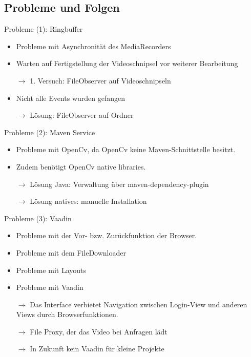 \documentclass[19pt]{beamer}
\begin{document}
\subsection{Probleme und Folgen}
\begin{frame}{Probleme (1): Ringbuffer}
	\begin{itemize}
		\item Probleme mit Asynchronität des MediaRecorders
		\pause
		\item Warten auf Fertigstellung der Videoschnipsel vor weiterer Bearbeitung
		\pause
		\item[$\rightarrow$] 1. Versuch: FileObserver auf Videoschnipseln
		\pause
		\item Nicht alle Events wurden gefangen
		\pause
		\item[$\rightarrow$] Lösung: FileObserver auf Ordner
	\end{itemize}
\end{frame}

\begin{frame}{Probleme (2): Maven Service}
	\begin{itemize}
		\item Probleme mit OpenCv, da OpenCv keine Maven-Schnittstelle besitzt.
		\pause
		\item Zudem benötigt OpenCv native libraries.
		\pause
		\item[$\rightarrow$] Lösung Java: Verwaltung über maven-dependency-plugin
		\pause
		\item[$\rightarrow$] Lösung natives: manuelle Installation
	\end{itemize}
\end{frame}

\begin{frame}{Probleme (3): Vaadin}
	\begin{itemize}
		\item Probleme mit der Vor- bzw. Zurückfunktion der Browser.
		\pause
		\item Probleme mit dem FileDownloader
		\pause
		\item Probleme mit Layouts
		\pause
		\item Probleme mit Vaadin
		\pause
		\item[$\rightarrow$] Das Interface verbietet Navigation zwischen Login-View und anderen Views durch Browserfunktionen.
		\pause
		\item[$\rightarrow$] File Proxy, der das Video bei Anfragen lädt
		\pause
		\item[$\rightarrow$] In Zukunft kein Vaadin für kleine Projekte
	\end{itemize}
\end{frame}
\end{document}
